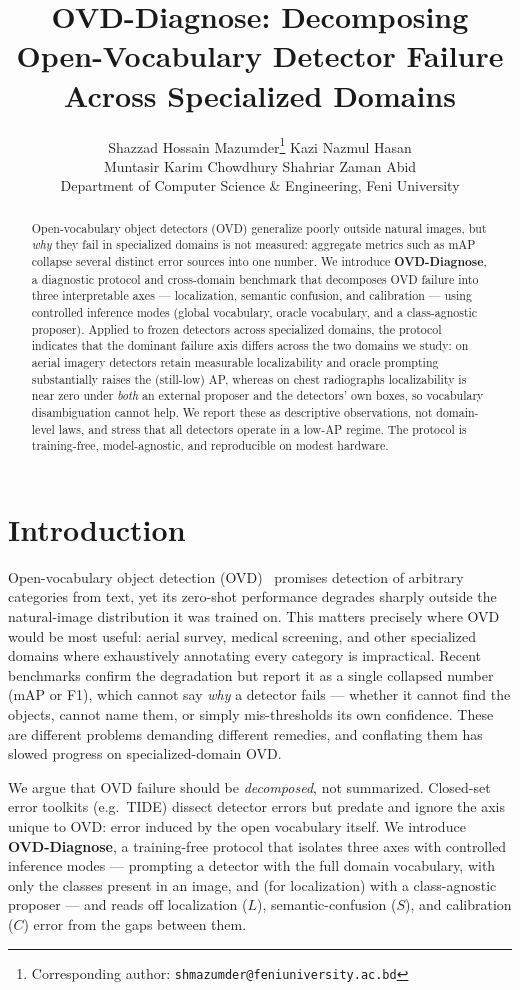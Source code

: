\documentclass[10pt,twocolumn,letterpaper]{article}
\title{OVD-Diagnose: Decomposing Open-Vocabulary Detector Failure\\ Across Specialized Domains}
\author{
  Shazzad Hossain Mazumder\thanks{Corresponding author:
  \texttt{shmazumder@feniuniversity.ac.bd}} \quad Kazi Nazmul Hasan \\
  Muntasir Karim Chowdhury \quad Shahriar Zaman Abid \\[2pt]
  Department of Computer Science \& Engineering, Feni University
}
\date{}
\begin{document}
\maketitle

\begin{abstract}
Open-vocabulary object detectors (OVD) generalize poorly outside natural images, but
\emph{why} they fail in specialized domains is not measured: aggregate metrics such as
mAP collapse several distinct error sources into one number. We introduce
\textbf{OVD-Diagnose}, a diagnostic protocol and cross-domain benchmark that decomposes
OVD failure into three interpretable axes --- localization, semantic confusion, and
calibration --- using controlled inference modes (global vocabulary, oracle vocabulary,
and a class-agnostic proposer). Applied to frozen detectors across specialized domains,
the protocol indicates that the dominant failure axis differs across the two domains we
study: on aerial imagery detectors retain measurable localizability and oracle prompting
substantially raises the (still-low) AP, whereas on chest radiographs localizability is near
zero under \emph{both} an external proposer and the detectors' own boxes, so vocabulary
disambiguation cannot help. We report these as descriptive observations, not domain-level
laws, and stress that all detectors operate in a low-AP regime. The protocol is
training-free, model-agnostic, and reproducible on modest hardware.
\end{abstract}

\section{Introduction}
\label{sec:intro}
Open-vocabulary object detection (OVD)~\cite{radford2021clip} promises detection of
arbitrary categories from text, yet its zero-shot performance degrades sharply outside
the natural-image distribution it was trained on. This matters precisely where OVD would
be most useful: aerial survey, medical screening, and other specialized domains where
exhaustively annotating every category is impractical. Recent benchmarks confirm the
degradation but report it as a single collapsed number (mAP or F1), which cannot say
\emph{why} a detector fails --- whether it cannot find the objects, cannot name them, or
simply mis-thresholds its own confidence. These are different problems demanding different
remedies, and conflating them has slowed progress on specialized-domain OVD.

We argue that OVD failure should be \emph{decomposed}, not summarized. Closed-set error
toolkits (e.g.\ TIDE) dissect detector errors but predate and ignore the axis unique to
OVD: error induced by the open vocabulary itself. We introduce \textbf{OVD-Diagnose}, a
training-free protocol that isolates three axes with controlled inference modes ---
prompting a detector with the full domain vocabulary, with only the classes present in an
image, and (for localization) with a class-agnostic proposer --- and reads off
localization ($L$), semantic-confusion ($S$), and calibration ($C$) error from the gaps
between them.
\end{document}
